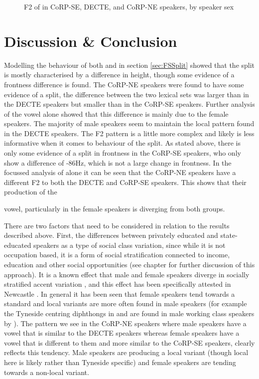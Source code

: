 \documentclass[../../../00.FullDoc/tex/ThesisSkeleton-draft2]{subfiles}
\begin{document}
\begin{figure}[h]
	
	\caption{F2 of \strutt{} in CoRP-SE, DECTE, and CoRP-NE speakers, by speaker sex} \label{fig:strutF2-sex}
\end{figure}

\section{Discussion \& Conclusion}
Modelling the behaviour of both \foot{} and \strutt{} in section \ref{sec:FSSplit} showed that the \FS{} split is mostly characterised by a difference in height, though some evidence of a frontness difference is found. The CoRP-NE speakers were found to have some evidence of a \FS{} split, the difference between the two lexical sets was larger than in the DECTE speakers but smaller than in the CoRP-SE speakers. Further analysis of the \strutt{} vowel alone showed that this difference is mainly due to the female speakers. The majority of male speakers seem to maintain the local pattern found in the DECTE speakers. The F2 pattern is a little more complex and likely is less informative when it comes to behaviour of the \FS{} split. As stated above, there is only some evidence of a split in frontness in the CoRP-SE speakers, who only show a difference of -86Hz, which is not a large change in frontness. In the focussed analysis of \strutt{} alone it can be seen that the CoRP-NE speakers have a different F2 to both the DECTE and CoRP-SE speakers. This shows that their production of the \strut{} vowel, particularly in the female speakers is diverging from both groups.

There are two factors that need to be considered in relation to the results described above.
First, the differences between privately educated and state-educated speakers as a type of social class variation, since while it is not occupation based, it is a form of social stratification connected to income, education and other social opportunities (see chapter \notinsubfile{\ref{ch:LitReviewSocio}} for further discussion of this approach). It is a known effect that male and female speakers diverge in socially stratified accent variation \citep{Labov2001b}, and this effect has been specifically attested in Newcastle \citep{Watt1998}. In general it has been seen that female speakers tend towards a standard and local variants are more often found in male speakers (for example the Tyneside centring diphthongs in \goat{} and  are found in male working class speakers by \cite{Watt1998}). The pattern we see in the CoRP-NE speakers where male speakers have a \strutt{} vowel that is similar to the DECTE speakers whereas female speakers have a \strutt{} vowel that is different to them and more similar to the CoRP-SE speakers, clearly reflects this tendency. Male speakers are producing a local variant (though local here is likely  rather than Tyneside specific) and female speakers are tending towards a non-local variant.
\end{document}
